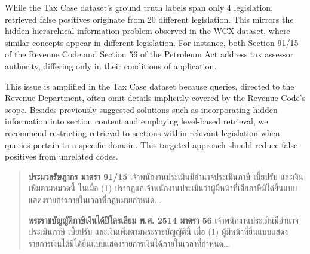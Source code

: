 

While the Tax Case dataset's ground truth labels span only 4 legislation, retrieved false positives originate from 20 different legislation. This mirrors the hidden hierarchical information problem observed in the WCX dataset, where similar concepts appear in different legislation. For instance, both Section 91/15 of the Revenue Code and Section 56 of the Petroleum Act address tax assessor authority, differing only in their conditions of application.

This issue is amplified in the Tax Case dataset because queries, directed to the Revenue Department, often omit details implicitly covered by the Revenue Code's scope. Besides previously suggested solutions such as incorporating hidden information into section content and employing level-based retrieval, we recommend restricting retrieval to sections within relevant legislation when queries pertain to a specific domain. This targeted approach should reduce false positives from unrelated codes.


    \begin{quote}
        \begin{thai}
        \textbf{ประมวลรัษฎากร มาตรา 91/15 } เจ้าพนักงานประเมินมีอำนาจประเมินภาษี เบี้ยปรับ และเงินเพิ่มตามหมวดนี้ ในเมื่อ
(1) ปรากฏแก่เจ้าพนักงานประเมินว่าผู้มีหน้าที่เสียภาษีมิได้ยื่นแบบแสดงรายการภายในเวลาที่กฎหมายกำหนด...
        
        \textbf{พระราชบัญญัติภาษีเงินได้ปิโตรเลียม พ.ศ. 2514 มาตรา 56} เจ้าพนักงานประเมินมีอำนาจประเมินภาษี เบี้ยปรับ และเงินเพิ่มตามพระราชบัญญัตินี้ เมื่อ
(1) ผู้มีหน้าที่ยื่นแบบแสดงรายการเงินได้มิได้ยื่นแบบแสดงรายการเงินได้ภายในเวลาที่กำหนด...         
        \end{thai}
    \end{quote}



